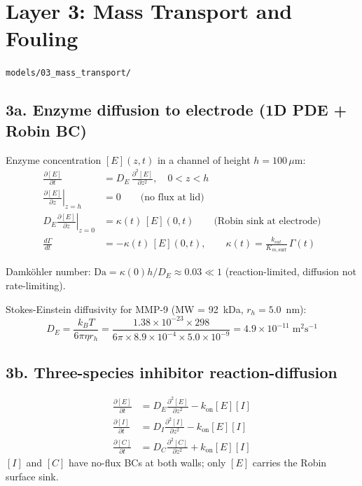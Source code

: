 \documentclass[10pt,a4paper]{article}
\numberwithin{equation}{section}
\newcommand{\file}[1]{\texttt{\small #1}}
\begin{document}
\section{Layer 3: Mass Transport and Fouling}
\file{models/03\_mass\_transport/}

\subsection{3a. Enzyme diffusion to electrode (1D PDE + Robin BC)}

Enzyme concentration $[E](z,t)$ in a channel of height $h = 100\,\mu$m:
\begin{align}
  \frac{\partial [E]}{\partial t} &= D_E\,\frac{\partial^2[E]}{\partial z^2},
  \quad 0 < z < h \\[3pt]
  \left.\frac{\partial [E]}{\partial z}\right|_{z=h} &= 0
  \qquad\text{(no flux at lid)} \\[3pt]
  D_E\left.\frac{\partial [E]}{\partial z}\right|_{z=0} &= \kappa(t)\,[E](0,t)
  \qquad\text{(Robin sink at electrode)} \\[3pt]
  \frac{d\Gamma}{dt} &= -\kappa(t)\,[E](0,t),
  \qquad \kappa(t) = \frac{k_{cat}}{K_{m,\text{surf}}}\,\Gamma(t)
\end{align}

Damk\"{o}hler number: $\mathrm{Da} = \kappa(0)h/D_E \approx 0.03 \ll 1$
(reaction-limited, diffusion not rate-limiting).

Stokes-Einstein diffusivity for MMP-9 (MW = 92~kDa, $r_h = 5.0$~nm):
\begin{equation}
  D_E = \frac{k_B T}{6\pi\eta r_h}
  = \frac{1.38\times10^{-23}\times298}{6\pi\times8.9\times10^{-4}\times5.0\times10^{-9}}
  = 4.9\times10^{-11}\;\text{m}^2\text{s}^{-1}
\end{equation}

\subsection{3b. Three-species inhibitor reaction-diffusion}

\begin{align}
  \frac{\partial [E]}{\partial t} &= D_E\frac{\partial^2[E]}{\partial z^2} - k_{\text{on}}[E][I] \\
  \frac{\partial [I]}{\partial t} &= D_I\frac{\partial^2[I]}{\partial z^2} - k_{\text{on}}[E][I] \\
  \frac{\partial [C]}{\partial t} &= D_C\frac{\partial^2[C]}{\partial z^2} + k_{\text{on}}[E][I]
\end{align}
$[I]$ and $[C]$ have no-flux BCs at both walls; only $[E]$ carries the Robin surface sink.
\end{document}
